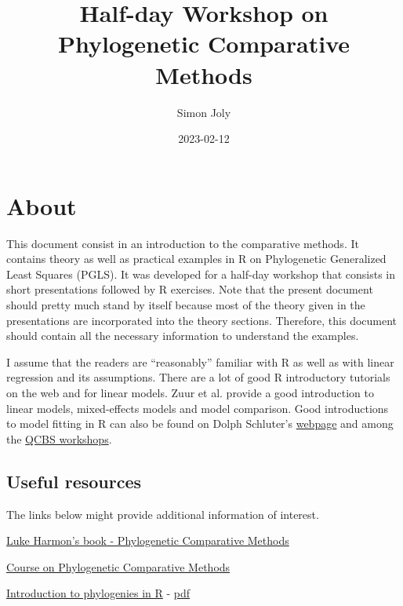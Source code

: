 \documentclass[
]{book}
\title{Half-day Workshop on Phylogenetic Comparative Methods}
\author{Simon Joly}
\date{2023-02-12}
\begin{document}
\maketitle

{
\setcounter{tocdepth}{1}
\tableofcontents
}
\hypertarget{about}{%
\chapter{About}\label{about}}

This document consist in an introduction to the comparative methods. It contains theory as well as practical examples in R on Phylogenetic Generalized Least Squares (PGLS). It was developed for a half-day workshop that consists in short presentations followed by R exercises. Note that the present document should pretty much stand by itself because most of the theory given in the presentations are incorporated into the theory sections. Therefore, this document should contain all the necessary information to understand the examples.

I assume that the readers are ``reasonably'' familiar with R as well as with linear regression and its assumptions. There are a lot of good R introductory tutorials on the web and for linear models. Zuur et al. \citep{zuur2007analysing} provide a good introduction to linear models, mixed-effects models and model comparison. Good introductions to model fitting in R can also be found on Dolph Schluter's \href{https://www.zoology.ubc.ca/~schluter/R/fit-model/}{webpage} and among the \href{http://qcbs.ca/wiki/r_workshop4}{QCBS workshops}.

\hypertarget{useful-resources}{%
\section{Useful resources}\label{useful-resources}}

The links below might provide additional information of interest.

\href{https://lukejharmon.github.io/pcm/}{Luke Harmon's book - Phylogenetic Comparative Methods}

\href{http://github.com/simjoly/CourseComparativeMethods/}{Course on Phylogenetic Comparative Methods}

\href{http://htmlpreview.github.io/?http://github.com/simjoly/CourseComparativeMethods/blob/master/lecture1/Introduction_phylo.html}{Introduction to phylogenies in R} - \href{http://github.com/simjoly/CourseComparativeMethods/blob/master/lecture1/Introduction_phylo.pdf}{pdf}
\end{document}
